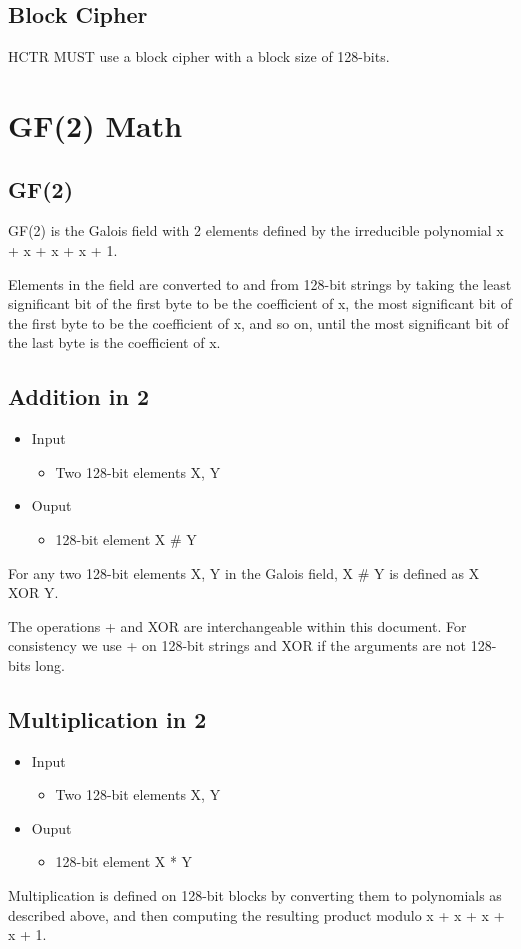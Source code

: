 \documentclass[i-d]{rfc}
\begin{document}
\subsection{Block Cipher}
HCTR MUST use a block cipher with a block size of 128-bits.

\section{GF(2) Math}\label{GFMath}

\subsection{GF(2)}
GF(2) is the Galois field with 2 elements defined by the irreducible polynomial x + x + x + x + 1.

Elements in the field are converted to and from 128-bit strings by taking the least significant bit of the first byte to be the coefficient of x, the most significant bit of the first byte to be the coefficient of x, and so on, until the most significant bit of the last byte is the coefficient of x.

\subsection{Addition in 2}
\begin{itemize}
    \item Input
    \begin{itemize}
        \item Two 128-bit elements X, Y
    \end{itemize}
    \item Ouput
    \begin{itemize}
        \item 128-bit element X \# Y
    \end{itemize}
\end{itemize}
For any two 128-bit elements X, Y in the Galois field, X \# Y is defined as X XOR Y.

The operations + and XOR are interchangeable within this document. For consistency we use + on 128-bit strings and XOR if the arguments are not 128-bits long.
\subsection{Multiplication in 2}
\begin{itemize}
    \item Input
    \begin{itemize}
        \item Two 128-bit elements X, Y
    \end{itemize}
    \item Ouput
    \begin{itemize}
        \item 128-bit element X * Y
    \end{itemize}
\end{itemize}
Multiplication is defined on 128-bit blocks by converting them to polynomials as described above, and then computing the resulting product modulo x + x + x + x + 1.
\end{document}
